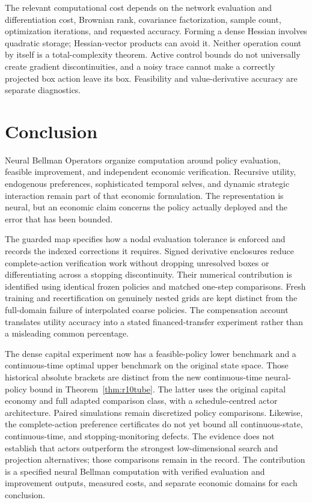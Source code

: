 \documentclass[ecta,draft]{econsocart}
\theoremstyle{definition}
\theoremstyle{remark}
\begin{document}
The relevant computational cost depends on the network evaluation and differentiation cost, Brownian rank, covariance factorization, sample count, optimization iterations, and requested accuracy. Forming a dense Hessian involves quadratic storage; Hessian-vector products can avoid it. Neither operation count by itself is a total-complexity theorem. Active control bounds do not universally create gradient discontinuities, and a noisy trace cannot make a correctly projected box action leave its box. Feasibility and value-derivative accuracy are separate diagnostics.







\section{Conclusion}\label{sec:conclusion}
Neural Bellman Operators organize computation around policy evaluation, feasible improvement, and independent economic verification. Recursive utility, endogenous preferences, sophisticated temporal selves, and dynamic strategic interaction remain part of that economic formulation. The representation is neural, but an economic claim concerns the policy actually deployed and the error that has been bounded.

The guarded map specifies how a nodal evaluation tolerance is enforced and records the indexed corrections it requires. Signed derivative enclosures reduce complete-action verification work without dropping unresolved boxes or differentiating across a stopping discontinuity. Their numerical contribution is identified using identical frozen policies and matched one-step comparisons. Fresh training and recertification on genuinely nested grids are kept distinct from the full-domain failure of interpolated coarse policies. The compensation account translates utility accuracy into a stated financed-transfer experiment rather than a misleading common percentage.

The dense capital experiment now has a feasible-policy lower benchmark and a continuous-time optimal upper benchmark on the original state space. Those historical absolute brackets are distinct from the new continuous-time neural-policy bound in Theorem~\ref{thm:r10tube}. The latter uses the original capital economy and full adapted comparison class, with a schedule-centred actor architecture. Paired simulations remain discretized policy comparisons. Likewise, the complete-action preference certificates do not yet bound all continuous-state, continuous-time, and stopping-monitoring defects. The evidence does not establish that actors outperform the strongest low-dimensional search and projection alternatives; those comparisons remain in the record. The contribution is a specified neural Bellman computation with verified evaluation and improvement outputs, measured costs, and separate economic domains for each conclusion.
\end{document}
